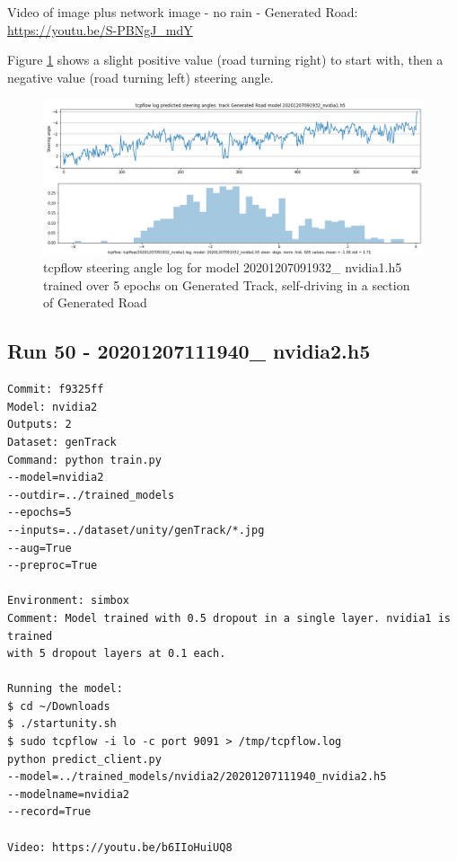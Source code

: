 Video of image plus network image - no rain - Generated Road:  
\url{https://youtu.be/S-PBNgJ_mdY} 

Figure \ref{fig:20201207091932_nvidia1_tcpflow} shows a slight positive value (road turning right) to start with, then a negative value (road turning left) steering angle.

\begin{figure}[ht]
 \centering 
 \includegraphics[width=\textwidth]{Figures/20201207091932_nvidia1_tcpflow.png}
 \caption{tcpflow steering angle log for model 20201207091932\_ nvidia1.h5 trained over 5 epochs on Generated Track, self-driving in a section of Generated Road}
 \label{fig:20201207091932_nvidia1_tcpflow}
\end{figure}

\subsection{Run 50 - 20201207111940\_ nvidia2.h5}
\label{app_res:50}
\begin{verbatim}
Commit: f9325ff
Model: nvidia2
Outputs: 2
Dataset: genTrack
Command: python train.py
--model=nvidia2
--outdir=../trained_models
--epochs=5
--inputs=../dataset/unity/genTrack/*.jpg
--aug=True
--preproc=True

Environment: simbox
Comment: Model trained with 0.5 dropout in a single layer. nvidia1 is trained
with 5 dropout layers at 0.1 each.

Running the model:
$ cd ~/Downloads
$ ./startunity.sh
$ sudo tcpflow -i lo -c port 9091 > /tmp/tcpflow.log
python predict_client.py
--model=../trained_models/nvidia2/20201207111940_nvidia2.h5
--modelname=nvidia2
--record=True

Video: https://youtu.be/b6IIoHuiUQ8

\end{verbatim}

